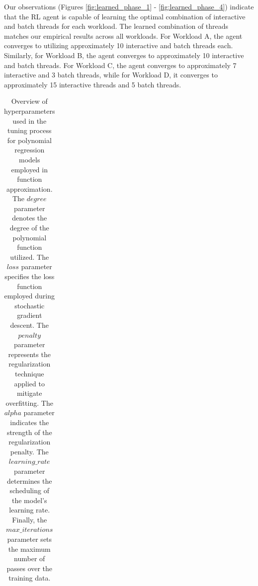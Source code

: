 Our observations (Figures \ref{fig:learned_phase_1} - \ref{fig:learned_phase_4}) indicate that the RL agent is capable of learning the optimal combination of interactive and batch threads for each workload. The learned combination of threads matches our empirical results across all workloads. For Workload A, the agent converges to utilizing approximately 10 interactive and batch threads each. Similarly, for Workload B, the agent converges to approximately 10 interactive and batch threads. For Workload C, the agent converges to approximately 7 interactive and 3 batch threads, while for Workload D, it converges to approximately 15 interactive threads and 5 batch threads.

\begin{table}[!htb]
  \centering
  \caption[Hyperparameter Tuning Options for Polynomial Regression Models]{Overview of hyperparameters used in the tuning process for polynomial regression models employed in function approximation. The $degree$ parameter denotes the degree of the polynomial function utilized. The $loss$ parameter specifies the loss function employed during stochastic gradient descent. The $penalty$ parameter represents the regularization technique applied to mitigate overfitting. The $alpha$ parameter indicates the strength of the regularization penalty. The $learning\_rate$ parameter determines the scheduling of the model's learning rate. Finally, the $max\_iterations$ parameter sets the maximum number of passes over the training data.}
  \label{table:hyperparameter_tuning}
  \begin{tabular}{|c|c|}
    \hline

\end{tabular}
\end{table}
